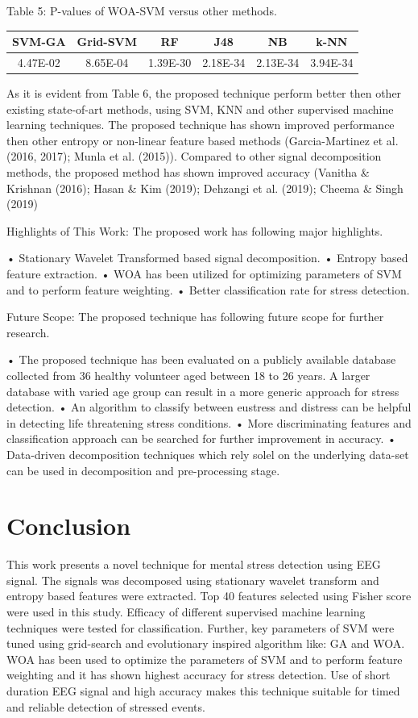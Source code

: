 Table 5: P-values of WOA-SVM versus other methods.


\begin{table}[htbp]
\centering
\begin{tabular}{|c|c|c|c|c|c|}\hline
SVM-GA & Grid-SVM & RF & J48 & NB & k-NN \\ \hline
4.47E-02 & 8.65E-04 & 1.39E-30 & 2.18E-34 & 2.13E-34 & 3.94E-34 \\ \hline
\end{tabular}\end{table}

As it is evident from Table 6, the proposed technique perform better then other existing state-of-art methods, using SVM, KNN and other supervised machine learning techniques. The proposed technique has shown improved performance then other entropy or non-linear feature based methods (Garcia-Martinez et al. (2016, 2017); Munla et al. (2015)). Compared to other signal decomposition methods, the proposed method has shown improved accuracy (Vanitha \& Krishnan (2016); Hasan \& Kim (2019); Dehzangi et al. (2019); Cheema \& Singh (2019)

Highlights of This Work: The proposed work has following major highlights.

• Stationary Wavelet Transformed based signal decomposition. • Entropy based feature extraction. • WOA has been utilized for optimizing parameters of SVM and to perform feature weighting. • Better classification rate for stress detection.

Future Scope: The proposed technique has following future scope for further research.

• The proposed technique has been evaluated on a publicly available database collected from 36 healthy volunteer aged between 18 to 26 years. A larger database with varied age group can result in a more generic approach for stress detection.
• An algorithm to classify between eustress and distress can be helpful in detecting life threatening stress conditions.
• More discriminating features and classification approach can be searched for further improvement in accuracy.
• Data-driven decomposition techniques which rely solel on the underlying data-set can be used in decomposition and pre-processing stage.

\section{Conclusion}

This work presents a novel technique for mental stress detection using EEG signal. The signals was decomposed using stationary wavelet transform and entropy based features were extracted. Top 40 features selected using Fisher score were used in this study. Efficacy of different supervised machine learning techniques were tested for classification. Further, key parameters of SVM were tuned using grid-search and evolutionary inspired algorithm like: GA and WOA. WOA has been used to optimize the parameters of SVM and to perform feature weighting and it has shown highest accuracy for stress detection. Use of short duration EEG signal and high accuracy makes this technique suitable for timed and reliable detection of stressed events.

